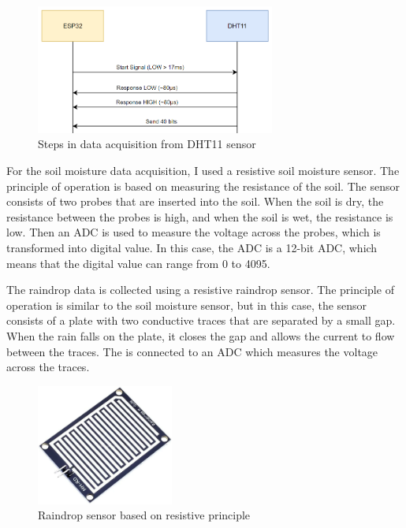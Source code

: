\begin{figure}[H]
    \centering
    \includegraphics[width=0.7\textwidth]{images/dht-steps.png}
    \caption{Steps in data acquisition from DHT11 sensor}
    \label{fig:dht-steps}
\end{figure}

For the soil moisture data acquisition, I used a resistive soil moisture sensor. The principle of operation is based
on measuring the resistance of the soil. The sensor consists of two probes that are inserted into the soil.
When the soil is dry, the resistance between the probes is high, and when the soil is wet, the resistance is low\cite{s20020363}.
Then an ADC is used to measure the voltage across the probes, which is transformed into digital value. In this case, the
ADC is a 12-bit ADC, which means that the digital value can range from 0 to 4095.

The raindrop data is collected using a resistive raindrop sensor. The principle of operation is similar to the soil moisture sensor, but 
in this case, the sensor consists of a plate with two conductive traces that are separated by a small gap.
When the rain falls on the plate, it closes the gap and allows the current to flow between the traces. The 
is connected to an ADC which measures the voltage across the traces.

\begin{figure}[H]
    \centering
    \includegraphics[width=0.4\textwidth]{images/rain-detector-sensor.png}
    \caption{Raindrop sensor based on resistive principle}
    \label{fig:raindrop-sensor}
\end{figure}

